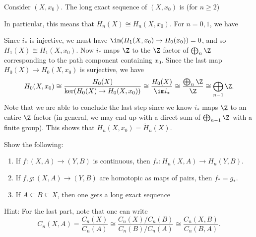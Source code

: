 \begin{example}
  Consider $(X, x_0)$. The long exact sequence of
  $(X, x_0)$ is (for $n \ge 2$)
  \begin{center}
  \end{center}
  In particular, this means that
  $H_n(X) \cong H_n(X, x_0)$. For $n = 0, 1$, we have
  \begin{center}
  \end{center}
  Since $i_*$ is injective, we must have
  $\im(H_1(X, x_0) \to H_0(x_0)) = 0$, and
  so $H_1(X) \cong H_1(X, x_0)$. Now $i_*$ maps
  $\Z$ to the $\Z$ factor of $\bigoplus_n \Z$
  corresponding to the path component containing
  $x_0$. Since the last map $H_0(X) \to H_0(X, x_0)$
  is surjective, we have
  \[
    H_0(X, x_0)
    \cong \frac{H_0(X)}{\ker(H_0(X) \to H_0(X, x_0))}
    \cong \frac{H_0(X)}{\im i_*}
    \cong \frac{\bigoplus_n \Z}{\Z}
    \cong \bigoplus_{n - 1} \Z.
  \]
  Note that we are able to conclude the last step
  since we know $i_*$ maps $\Z$ to an entire $\Z$
  factor (in general, we may end up with a direct sum
  of $\bigoplus_{n - 1} \Z$ with a finite group).
  This shows that $H_n(X, x_0) = \widetilde{H}_n(X)$.
\end{example}

\begin{exercise}
  Show the following:
  \begin{enumerate}
    \item If $f : (X, A) \to (Y, B)$ is continuous,
      then $f_* : H_n(X, A) \to H_n(Y, B)$.
    \item If $f, g : (X, A) \to (Y, B)$ are homotopic
      as maps of pairs, then $f_* = g_*$.
    \item If $A \subseteq B \subseteq X$, then one
      gets a long exact sequence
      \begin{center}
      \end{center}
  \end{enumerate}
  Hint: For the last part, note that one can write
  \[
    C_n(X, A)
    = \frac{C_n(X)}{C_n(A)}
    \cong \frac{C_n(X) / C_n(B)}{C_n(B) / C_n(A)}
    \cong \frac{C_n(X, B)}{C_n(B, A)}.
  \]
\end{exercise}

